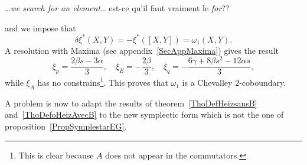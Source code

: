 \begin{probleme}
	\emph{\ldots we search for an element\ldots} est-ce qu'il faut vraiment le \emph{for}??
\end{probleme}

and we impose that
\begin{equation}
	\delta\xi^*(X,Y)=-\xi^*([X,Y])=\omega_{1}(X,Y).
\end{equation}
A resolution with Maxima (see appendix~\ref{SecAppMaxima}) gives the result
\begin{equation}  \label{EqSolxialgun}
	\xi_{p}=\frac{ 2\beta s-3\alpha }{ 3 },\quad\xi_{E}=-\frac{ 2\beta }{ 3 },\quad\xi_{q}=-\frac{ 6\gamma+8 \beta s^{2}-12\alpha s }{ 3 },
\end{equation}
while $\xi_{A}$ has no constrains\footnote{This is clear because $A$ does not appear in the commutators.}. This proves that $\omega_{1}$ is a Chevalley $2$-coboundary.

A problem is now to adapt the results of theorem~\ref{ThoDefHeizsansB} and~\ref{ThoDefoHeizAvecB} to the new symplectic form which is not the one of proposition~\ref{PropSymplestarEG}.


